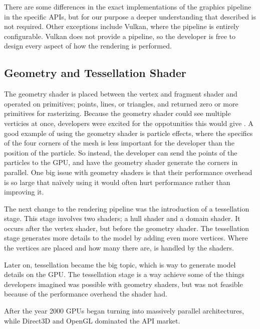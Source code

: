 \vspace{1em}

\noindent There are some differences in the exact implementations of the graphics pipeline in the specific \glspl{API}, but for our purpose a deeper understanding that described is not required.
Other exceptions include Vulkan, where the pipeline is entirely configurable.
Vulkan does not provide a pipeline, so the developer is free to design every aspect of how the rendering is performed. 

\subsection{Geometry and Tessellation Shader}
The geometry shader is placed between the vertex and fragment shader and operated on primitives; points, lines, or triangles, and returned zero or more primitives for rasterizing.
Because the geometry shader could see multiple verticies at once, developers were excited for the oppotunities this would give \cite{kronos????geometry, microsoft????geometry}.
A good example of using the geometry shader is particle effects, where the specifics of the four corners of the mesh is less important for the developer than the position of the particle.
So instead, the developer can send the points of the particles to the \gls{GPU}, and have the geometry shader generate the corners in parallel.
One big issue with geometry shaders is that their performance overhead is so large that naïvely using it would often hurt performance rather than improving it.

The next change to the rendering pipeline was the introduction of a tessellation stage.
This stage involves two shaders; a hull shader and a domain shader.
It occurs after the vertex shader, but before the geometry shader.
The tessellation stage generates more details to the model by adding even more vertices.
Where the vertices are placed and how many there are, is handled by the shaders.

Later on, tessellation became the big topic, which is way to generate model details on the \gls{GPU}.
The tessellation stage is a way achieve some of the things developers imagined was possible with geometry shaders, but was not feasible because of the performance overhead the shader had.

After the year 2000 \glspl{GPU} began turning into massively parallel architectures, while Direct3D and OpenGL dominated the \gls{API} market. 
